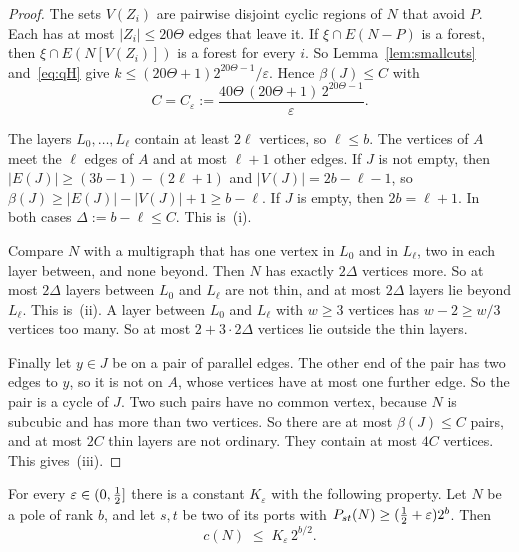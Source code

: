 \begin{proof}
The sets $V(Z_i)$ are pairwise disjoint cyclic regions of $N$ that avoid $P$. Each has at most
$|Z_i|\le20\Theta$ edges that leave it. If $\xi\cap E(N-P)$ is a forest, then
$\xi\cap E(N[V(Z_i)])$ is a forest for every $i$. So Lemma~\ref{lem:smallcuts} and~\eqref{eq:qH}
give $k\le(20\Theta+1)2^{20\Theta-1}/\varepsilon$. Hence $\beta(J)\le C$ with
\[
  C=C_\varepsilon:=\frac{40\Theta\,(20\Theta+1)\,2^{20\Theta-1}}{\varepsilon}.
\]

 The layers $L_0,\dots,L_\ell$ contain at least $2\ell$ vertices, so
$\ell\le b$. The vertices of $A$ meet the $\ell$ edges of $A$ and at most $\ell+1$ other edges.
If $J$ is not empty, then $|E(J)|\ge(3b-1)-(2\ell+1)$ and $|V(J)|=2b-\ell-1$, so
$\beta(J)\ge|E(J)|-|V(J)|+1\ge b-\ell$. If $J$ is empty, then $2b=\ell+1$. In both cases
$\Delta:=b-\ell\le C$. This is~(i).

Compare $N$ with a multigraph that has one vertex in $L_0$ and in $L_\ell$, two in each layer
between, and none beyond. Then $N$ has exactly $2\Delta$ vertices more. So at most $2\Delta$
layers between $L_0$ and $L_\ell$ are not thin, and at most $2\Delta$ layers lie beyond $L_\ell$.
This is~(ii). A layer between $L_0$ and $L_\ell$ with $w\ge3$ vertices has $w-2\ge w/3$ vertices
too many. So at most $2+3\cdot2\Delta$ vertices lie outside the thin layers.

Finally let $y\in J$ be on a pair of parallel edges. The other end of the pair has two edges to
$y$, so it is not on $A$, whose vertices have at most one further edge. So the pair is a cycle of
$J$. Two such pairs have no common vertex,
because $N$ is subcubic and has more than two vertices. So there are at most $\beta(J)\le C$ pairs,
and at most $2C$ thin layers are not ordinary. They contain at most $4C$ vertices. This gives~(iii).
\end{proof}

\begin{theorem}\label{thm:fewcycles}
For every $\varepsilon\in(0,\tfrac12]$ there is a constant $K_\varepsilon$ with the following property.
Let $N$ be a pole of rank $b$, and let $s,t$ be two of its ports with
$P_{st}(N)\ge(\tfrac12+\varepsilon)2^{b}$. Then
\[
  c(N)\;\le\;K_\varepsilon\,2^{b/2}.
\]
\end{theorem}

